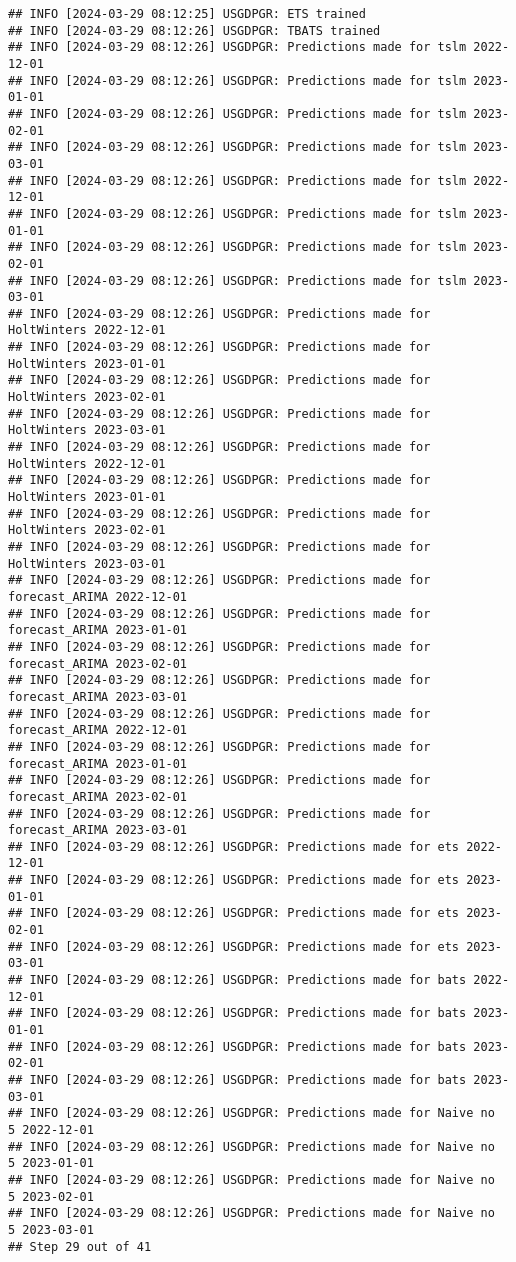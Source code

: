 \documentclass[
]{article}
\begin{document}
\begin{verbatim}
## INFO [2024-03-29 08:12:25] USGDPGR: ETS trained
## INFO [2024-03-29 08:12:26] USGDPGR: TBATS trained
## INFO [2024-03-29 08:12:26] USGDPGR: Predictions made for tslm 2022-12-01
## INFO [2024-03-29 08:12:26] USGDPGR: Predictions made for tslm 2023-01-01
## INFO [2024-03-29 08:12:26] USGDPGR: Predictions made for tslm 2023-02-01
## INFO [2024-03-29 08:12:26] USGDPGR: Predictions made for tslm 2023-03-01
## INFO [2024-03-29 08:12:26] USGDPGR: Predictions made for tslm 2022-12-01
## INFO [2024-03-29 08:12:26] USGDPGR: Predictions made for tslm 2023-01-01
## INFO [2024-03-29 08:12:26] USGDPGR: Predictions made for tslm 2023-02-01
## INFO [2024-03-29 08:12:26] USGDPGR: Predictions made for tslm 2023-03-01
## INFO [2024-03-29 08:12:26] USGDPGR: Predictions made for HoltWinters 2022-12-01
## INFO [2024-03-29 08:12:26] USGDPGR: Predictions made for HoltWinters 2023-01-01
## INFO [2024-03-29 08:12:26] USGDPGR: Predictions made for HoltWinters 2023-02-01
## INFO [2024-03-29 08:12:26] USGDPGR: Predictions made for HoltWinters 2023-03-01
## INFO [2024-03-29 08:12:26] USGDPGR: Predictions made for HoltWinters 2022-12-01
## INFO [2024-03-29 08:12:26] USGDPGR: Predictions made for HoltWinters 2023-01-01
## INFO [2024-03-29 08:12:26] USGDPGR: Predictions made for HoltWinters 2023-02-01
## INFO [2024-03-29 08:12:26] USGDPGR: Predictions made for HoltWinters 2023-03-01
## INFO [2024-03-29 08:12:26] USGDPGR: Predictions made for forecast_ARIMA 2022-12-01
## INFO [2024-03-29 08:12:26] USGDPGR: Predictions made for forecast_ARIMA 2023-01-01
## INFO [2024-03-29 08:12:26] USGDPGR: Predictions made for forecast_ARIMA 2023-02-01
## INFO [2024-03-29 08:12:26] USGDPGR: Predictions made for forecast_ARIMA 2023-03-01
## INFO [2024-03-29 08:12:26] USGDPGR: Predictions made for forecast_ARIMA 2022-12-01
## INFO [2024-03-29 08:12:26] USGDPGR: Predictions made for forecast_ARIMA 2023-01-01
## INFO [2024-03-29 08:12:26] USGDPGR: Predictions made for forecast_ARIMA 2023-02-01
## INFO [2024-03-29 08:12:26] USGDPGR: Predictions made for forecast_ARIMA 2023-03-01
## INFO [2024-03-29 08:12:26] USGDPGR: Predictions made for ets 2022-12-01
## INFO [2024-03-29 08:12:26] USGDPGR: Predictions made for ets 2023-01-01
## INFO [2024-03-29 08:12:26] USGDPGR: Predictions made for ets 2023-02-01
## INFO [2024-03-29 08:12:26] USGDPGR: Predictions made for ets 2023-03-01
## INFO [2024-03-29 08:12:26] USGDPGR: Predictions made for bats 2022-12-01
## INFO [2024-03-29 08:12:26] USGDPGR: Predictions made for bats 2023-01-01
## INFO [2024-03-29 08:12:26] USGDPGR: Predictions made for bats 2023-02-01
## INFO [2024-03-29 08:12:26] USGDPGR: Predictions made for bats 2023-03-01
## INFO [2024-03-29 08:12:26] USGDPGR: Predictions made for Naive no  5 2022-12-01
## INFO [2024-03-29 08:12:26] USGDPGR: Predictions made for Naive no  5 2023-01-01
## INFO [2024-03-29 08:12:26] USGDPGR: Predictions made for Naive no  5 2023-02-01
## INFO [2024-03-29 08:12:26] USGDPGR: Predictions made for Naive no  5 2023-03-01
## Step 29 out of 41
\end{verbatim}
\end{document}
